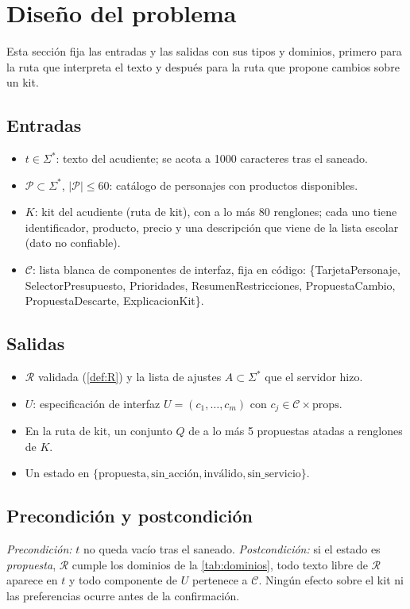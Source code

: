 \documentclass[11pt,letterpaper]{article}
\newcommand{\R}{\mathcal{R}}
\begin{document}
\section{Dise\~no del problema}\label{sec:diseno}

Esta secci\'on fija las entradas y las salidas con sus tipos y dominios, primero para la ruta que interpreta
el texto y despu\'es para la ruta que propone cambios sobre un kit.

\subsection*{Entradas}
\begin{itemize}
  \item $t\in\Sigma^{*}$: texto del acudiente; se acota a 1000 caracteres tras el saneado.
  \item $\mathcal{P}\subset\Sigma^{*}$, $|\mathcal{P}|\le 60$: cat\'alogo de personajes con productos disponibles.
  \item $K$: kit del acudiente (ruta de kit), con a lo m\'as 80 renglones; cada uno tiene identificador, producto,
  precio y una descripci\'on que viene de la lista escolar (dato no confiable).
  \item $\mathcal{C}$: lista blanca de componentes de interfaz, fija en c\'odigo:
  \{TarjetaPersonaje, SelectorPresupuesto, Prioridades, ResumenRestricciones, PropuestaCambio,
  PropuestaDescarte, ExplicacionKit\}.
\end{itemize}

\subsection*{Salidas}
\begin{itemize}
  \item $\R$ validada (\cref{def:R}) y la lista de ajustes $A\subset\Sigma^{*}$ que el servidor hizo.
  \item $U$: especificaci\'on de interfaz $U=(c_1,\dots,c_m)$ con $c_j\in\mathcal{C}\times\text{props}$.
  \item En la ruta de kit, un conjunto $Q$ de a lo m\'as 5 propuestas atadas a renglones de $K$.
  \item Un estado en $\{\text{propuesta},\text{sin\_acci\'on},\text{inv\'alido},\text{sin\_servicio}\}$.
\end{itemize}

\subsection*{Precondici\'on y postcondici\'on}
\emph{Precondici\'on:} $t$ no queda vac\'io tras el saneado. \emph{Postcondici\'on:} si el estado es
\emph{propuesta}, $\R$ cumple los dominios de la \cref{tab:dominios}, todo texto libre de $\R$ aparece en $t$
y todo componente de $U$ pertenece a $\mathcal{C}$. Ning\'un efecto sobre el kit ni las preferencias ocurre
antes de la confirmaci\'on.
\end{document}
